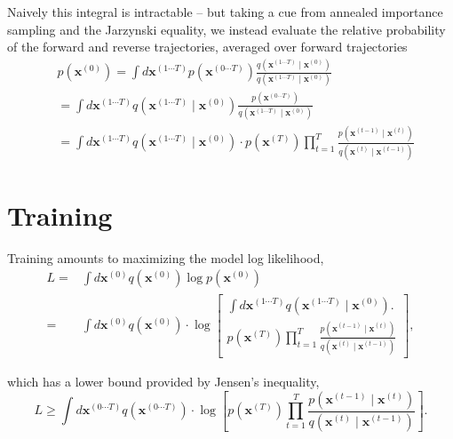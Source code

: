 Naively this integral is intractable – but taking a cue from annealed importance sampling and the Jarzynski equality, we instead evaluate the relative probability of the forward and reverse trajectories, averaged over forward trajectories
\begin{equation}
  \label{eq:34}
\begin{aligned}
& p\left(\mathbf{x}^{(0)}\right)=\int d \mathbf{x}^{(1 \cdots T)} p\left(\mathbf{x}^{(0 \cdots T)}\right) \frac{q\left(\mathbf{x}^{(1 \cdots T)} \mid \mathbf{x}^{(0)}\right)}{q\left(\mathbf{x}^{(1 \cdots T)} \mid \mathbf{x}^{(0)}\right)} \\
&=\int d \mathbf{x}^{(1 \cdots T)} q\left(\mathbf{x}^{(1 \cdots T)} \mid \mathbf{x}^{(0)}\right) \frac{p\left(\mathbf{x}^{(0 \cdots T)}\right)}{q\left(\mathbf{x}^{(1 \cdots T)} \mid \mathbf{x}^{(0)}\right)} \\
&=\int d \mathbf{x}^{(1 \cdots T)} q\left(\mathbf{x}^{(1 \cdots T)} \mid \mathbf{x}^{(0)}\right) \cdot p\left(\mathbf{x}^{(T)}\right) \prod_{t=1}^T \frac{p\left(\mathbf{x}^{(t-1)} \mid \mathbf{x}^{(t)}\right)}{q\left(\mathbf{x}^{(t)} \mid \mathbf{x}^{(t-1)}\right)}
\end{aligned}  
\end{equation}


\section{Training}
\label{sec:training}

Training amounts to maximizing the model log likelihood,
\begin{equation}
  \label{eq:35}
\begin{aligned}
L= & \int d \mathbf{x}^{(0)} q\left(\mathbf{x}^{(0)}\right) \log p\left(\mathbf{x}^{(0)}\right) \\
= & \int d \mathbf{x}^{(0)} q\left(\mathbf{x}^{(0)}\right) \cdot 
 \log \left[\begin{array}{c}
\int d \mathbf{x}^{(1 \cdots T)} q\left(\mathbf{x}^{(1 \cdots T)} \mid \mathbf{x}^{(0)}\right) . \\
p\left(\mathbf{x}^{(T)}\right) \prod_{t=1}^T \frac{p\left(\mathbf{x}^{(t-1)} \mid \mathbf{x}^{(t)}\right)}{q\left(\mathbf{x}^{(t)} \mid \mathbf{x}^{(t-1)}\right)}
\end{array}\right],
\end{aligned}
\end{equation}


which has a lower bound provided by Jensen's inequality,
\begin{equation}
  \label{eq:37}
L \geq  \int d \mathbf{x}^{(0 \cdots T)} q\left(\mathbf{x}^{(0 \cdots T)}\right) \cdot  \log \left[p\left(\mathbf{x}^{(T)}\right) \prod_{t=1}^T \frac{p\left(\mathbf{x}^{(t-1)} \mid \mathbf{x}^{(t)}\right)}{q\left(\mathbf{x}^{(t)} \mid \mathbf{x}^{(t-1)}\right)}\right] .  
\end{equation}




